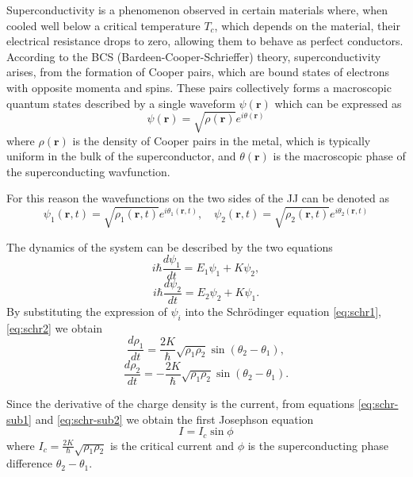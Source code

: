 Superconductivity is a phenomenon observed in certain materials where, when cooled well below a critical temperature $T_c$, which depends on the material, their electrical resistance drops to zero, allowing them to behave as perfect conductors.
According to the BCS (Bardeen-Cooper-Schrieffer) theory, superconductivity arises, from the formation of Cooper pairs, which are bound states of electrons with opposite momenta and spins.
These pairs collectively forms a macroscopic quantum states described by a single waveform $\psi(\mathbf{r})$ which can be expressed as 
\begin{equation}\label{eq:BCSequation}
    \psi(\mathbf{r}) = \sqrt{\rho(\mathbf{r})}e^{i\theta(\mathbf{r})}
\end{equation}
where $\rho(\mathbf{r})$ is the density of Cooper pairs in the metal, which is typically uniform in the bulk of the superconductor, and $\theta(\mathbf{r})$ is the macroscopic phase of the superconducting wavfunction.

For this reason the wavefunctions on the two sides of the JJ can be denoted as
\begin{equation}\label{eq:JosephsonWavefunctions}
    \psi_1(\mathbf{r}, t) = \sqrt{\rho_1(\mathbf{r}, t)} e^{i\theta_1(\mathbf{r},t)}, \quad \psi_2(\mathbf{r}, t) = \sqrt{\rho_2(\mathbf{r}, t)} e^{i\theta_2(\mathbf{r},t)}
\end{equation}

The dynamics of the system can be described by the two equations\begin{equation}\label{eq:schr1}
    i\hbar \frac{d\psi_1}{dt} = E_1 \psi_1 + K \psi_2,
\end{equation}
\begin{equation}\label{eq:schr2}
    i\hbar \frac{d\psi_2}{dt} = E_2 \psi_2 + K \psi_1.
\end{equation}
By substituting the expression of $\psi_i$ into the Schr\"odinger equation \ref{eq:schr1}, \ref{eq:schr2} we obtain
\begin{equation}\label{eq:schr-sub1}
    \frac{d\rho_1}{dt} = \frac{2K}{\hbar} \sqrt{\rho_1 \rho_2} \sin(\theta_2 - \theta_1),
\end{equation}
\begin{equation}\label{eq:schr-sub2}
    \frac{d\rho_2}{dt} = -\frac{2K}{\hbar} \sqrt{\rho_1 \rho_2} \sin(\theta_2 - \theta_1).
\end{equation}

Since the derivative of the charge density is the current, from equations \ref{eq:schr-sub1} and \ref{eq:schr-sub2} we obtain the first Josephson equation
\begin{equation}\label{eq:Josephson1}
    I=I_c\sin{\phi}
\end{equation} 
where $I_c = \frac{2K}{\hbar}\sqrt{\rho_1\rho_2}$ is the critical current and $\phi$ is the superconducting phase difference $\theta_2 - \theta_1$.

